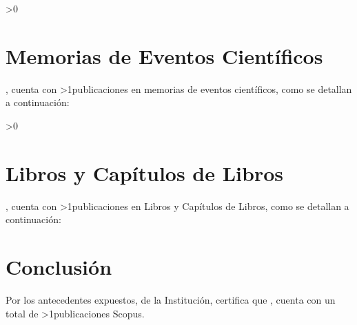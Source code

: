 \documentclass[fleqn,10pt]{wlscirep}
\begin{document}
\ifnum\numMemorias>0{
\section*{Memorias de Eventos Científicos}
\ifnum{}\fi \docente, cuenta con \numMemorias \ifnum\numMemorias>1{publicaciones en memorias de eventos científicos, como se detallan a continuación}\fi:
\begin{enumerate}
\detalleMemorias
\end{enumerate}
\vspace{1mm}
\ifnum{}\fi
}\fi

\ifnum\numLibros>0{
\section*{Libros y Capítulos de Libros}
\ifnum{}\fi \docente , cuenta con \numLibros \ifnum\numLibros>1{publicaciones en Libros y Capítulos de Libros, como se detallan a continuación}\fi:
\begin{enumerate}
\detalleLibros
\end{enumerate}
\vspace{1mm}
\ifnum{}\fi
}\fi

\section*{Conclusión}

Por los antecedentes expuestos, \ifnum{}\fi de la Institución, certifica que \ifnum{}\fi \docente, cuenta con un total de \numTotalPubRegyScopus \ifnum\numTotalPubRegyScopus>1{publicaciones Scopus.}\fi \\
\end{document}
